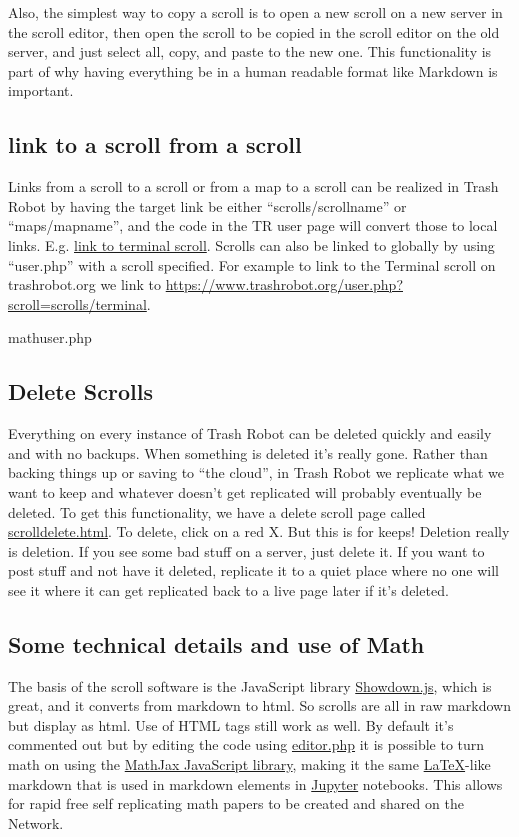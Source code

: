Also, the simplest way to copy a scroll is to open a new scroll on a new
server in the scroll editor, then open the scroll to be copied in the
scroll editor on the old server, and just select all, copy, and paste to
the new one. This functionality is part of why having everything be in a
human readable format like Markdown is important.

\subsection{link to a scroll from a
scroll}\label{link-to-a-scroll-from-a-scroll}

Links from a scroll to a scroll or from a map to a scroll can be
realized in Trash Robot by having the target link be either
``scrolls/scrollname'' or ``maps/mapname'', and the code in the TR user
page will convert those to local links. E.g.
\href{scrolls/terminal}{link to terminal scroll}. Scrolls can also be
linked to globally by using ``user.php'' with a scroll specified. For
example to link to the Terminal scroll on trashrobot.org we link to
\url{https://www.trashrobot.org/user.php?scroll=scrolls/terminal}.

mathuser.php

\subsection{Delete Scrolls}\label{delete-scrolls}

Everything on every instance of Trash Robot can be deleted quickly and
easily and with no backups. When something is deleted it's really gone.
Rather than backing things up or saving to ``the cloud'', in Trash Robot
we replicate what we want to keep and whatever doesn't get replicated
will probably eventually be deleted. To get this functionality, we have
a delete scroll page called \url{scrolldelete.html}. To delete, click on
a red X. But this is for keeps! Deletion really is deletion. If you see
some bad stuff on a server, just delete it. If you want to post stuff
and not have it deleted, replicate it to a quiet place where no one will
see it where it can get replicated back to a live page later if it's
deleted.

\subsection{Some technical details and use of
Math}\label{some-technical-details-and-use-of-math}

The basis of the scroll software is the JavaScript library
\href{http://showdownjs.com/}{Showdown.js}, which is great, and it
converts from markdown to html. So scrolls are all in raw markdown but
display as html. Use of HTML tags still work as well. By default it's
commented out but by editing the code using \url{editor.php} it is
possible to turn math on using the
\href{https://www.mathjax.org/}{MathJax JavaScript library}, making it
the same \href{https://www.latex-project.org/}{LaTeX}-like markdown that
is used in markdown elements in \href{https://jupyter.org/}{Jupyter}
notebooks. This allows for rapid free self replicating math papers to be
created and shared on the Network.

